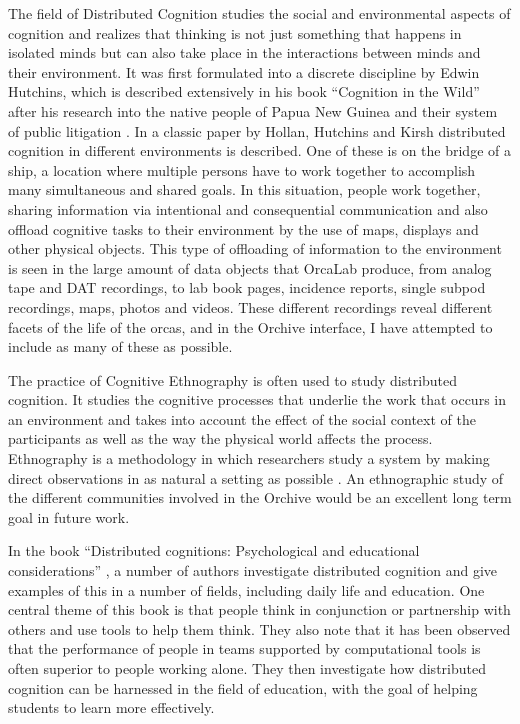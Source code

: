 \documentclass[12pt,oneside]{book}
\begin{document}
The field of Distributed Cognition studies the social and
environmental aspects of cognition and realizes that thinking is not
just something that happens in isolated minds but can also take place
in the interactions between minds and their environment.  It was first
formulated into a discrete discipline by Edwin Hutchins, which is
described extensively in his book ``Cognition in the Wild''
\cite{hutchins1996cognition} after his research into the native people
of Papua New Guinea and their system of public litigation
\cite{hutchins1980culture}.  In a classic paper by Hollan, Hutchins
and Kirsh \cite{hollan2000distributed} distributed cognition in
different environments is described.  One of these is on the bridge of
a ship, a location where multiple persons have to work together to
accomplish many simultaneous and shared goals.  In this situation,
people work together, sharing information via intentional and
consequential communication and also offload cognitive tasks to their
environment by the use of maps, displays and other physical objects.
This type of offloading of information to the environment is seen in
the large amount of data objects that OrcaLab produce, from analog
tape and DAT recordings, to lab book pages, incidence reports, single
subpod recordings, maps, photos and videos.  These different
recordings reveal different facets of the life of the orcas, and in
the Orchive interface, I have attempted to include as many of these
as possible.

The practice of Cognitive Ethnography \cite{hollan2000distributed} is
often used to study distributed cognition.  It studies the cognitive
processes that underlie the work that occurs in an environment and
takes into account the effect of the social context of the
participants as well as the way the physical world affects the
process.  Ethnography is a methodology in which researchers study a
system by making direct observations in as natural a setting as
possible \cite{mcgrath1995methodology}.  An ethnographic study of the
different communities involved in the Orchive would be an excellent
long term goal in future work.

In the book ``Distributed cognitions: Psychological and educational
considerations'' \cite{salomon1997distributed}, a number of authors
investigate distributed cognition and give examples of this in a
number of fields, including daily life and education.  One central
theme of this book is that people think in conjunction or partnership
with others and use tools to help them think.  They also note that it
has been observed that the performance of people in teams supported by
computational tools is often superior to people working alone.  They
then investigate how distributed cognition can be harnessed in the
field of education, with the goal of helping students to learn more
effectively.
\end{document}
